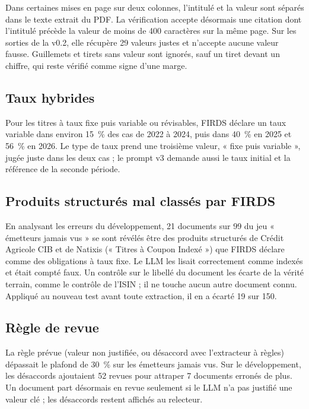 \documentclass[11pt,a4paper]{article}
\begin{document}
Dans certaines mises en page sur deux colonnes, l'intitulé et la valeur sont séparés dans le texte extrait du PDF. La vérification accepte désormais une citation dont l'intitulé précède la valeur de moins de 400 caractères sur la même page. Sur les sorties de la v0.2, elle récupère 29 valeurs justes et n'accepte aucune valeur fausse. Guillemets et tirets sans valeur sont ignorés, sauf un tiret devant un chiffre, qui reste vérifié comme signe d'une marge.

\subsection{Taux hybrides}

Pour les titres à taux fixe puis variable ou révisables, FIRDS déclare un taux variable dans environ 15~\% des cas de 2022 à 2024, puis dans 40~\% en 2025 et 56~\% en 2026. Le type de taux prend une troisième valeur, « fixe puis variable », jugée juste dans les deux cas ; le prompt v3 demande aussi le taux initial et la référence de la seconde période.

\subsection{Produits structurés mal classés par FIRDS}

En analysant les erreurs du développement, 21 documents sur 99 du jeu « émetteurs jamais vus » se sont révélés être des produits structurés de Crédit Agricole CIB et de Natixis (« Titres à Coupon Indexé ») que FIRDS déclare comme des obligations à taux fixe. Le LLM les lisait correctement comme indexés et était compté faux. Un contrôle sur le libellé du document les écarte de la vérité terrain, comme le contrôle de l'ISIN ; il ne touche aucun autre document connu. Appliqué au nouveau test avant toute extraction, il en a écarté 19 sur 150.


\subsection{Règle de revue}

La règle prévue (valeur non justifiée, ou désaccord avec l'extracteur à règles) dépassait le plafond de 30~\% sur les émetteurs jamais vus. Sur le développement, les désaccords ajoutaient 52 revues pour attraper 7 documents erronés de plus. Un document part désormais en revue seulement si le LLM n'a pas justifié une valeur clé ; les désaccords restent affichés au relecteur.
\end{document}
